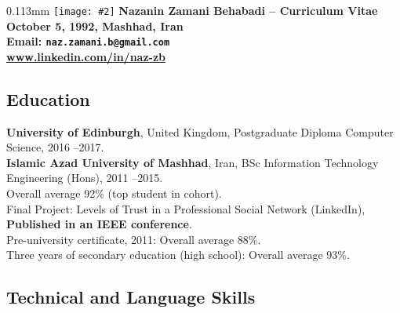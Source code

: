 \documentclass[10pt]{article}
\newcommand{\imagetext}[3][0.11]{%
\begin{imagetextbox}[]{#1\textwidth}{3mm}%
  \texttt{[image: \#2]}%
  \tcblower%
   #3%
\end{imagetextbox}}
\begin{document}
\imagetext{1.jpg}{\Large\bf Nazanin Zamani Behabadi -- \textcolor{ green!50!red}{Curriculum Vitae} \\ \normalsize October 5, 1992, Mashhad, Iran \\ \normalsize Email: \texttt{naz.zamani.b@gmail.com}\\ \href{https://www.linkedin.com/in/nazanin-zamani-behabadi-a2511398/}{\underline{www.linkedin.com/in/naz-zb}}}
\thispagestyle{empty}

\subsection*{Education}
\noindent \textbf{University of Edinburgh}, United Kingdom, Postgraduate Diploma Computer Science, 2016 --2017.\vspace{1mm}\\
\noindent \textbf{Islamic Azad University of Mashhad}, Iran, BSc Information Technology Engineering (Hons), 2011 --2015. \\
\indent Overall average 92\%  (top student in cohort).\\
\indent Final Project: Levels of Trust in a Professional Social Network (LinkedIn), \textbf {Published in an IEEE conference}.\vspace{1mm}\\
\noindent Pre-university certificate, 2011: Overall average  88\%. \\
\noindent Three years of secondary education (high school): Overall average  93\%.

\subsection*{Technical and Language Skills}
\end{document}
